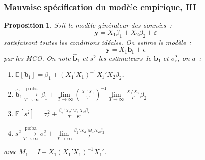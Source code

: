 \documentclass[10pt]{beamer}
\theoremstyle{plain}
\newtheorem{prop}{Proposition}
\begin{document}
\begin{frame}
  \frametitle{Mauvaise spécification du modèle empirique, III}

  \begin{prop}\label{prop:mispecification}
    Soit le modèle générateur des données~:
    \[
      \mathbf y = X_1\beta_1 + X_2\beta_2 + \varepsilon
    \]
    satisfaisant toutes les conditions idéales. On estime le modèle~:
    \[
      \mathbf y = X_1\mathbf b_1 + \epsilon
    \]
    par les MCO. On note $\hat{\mathbf b}_1$ et $s^2$ les estimateurs de $\mathbf b_1$ et $\sigma_{\varepsilon}^2$, on a~:
    \begin{enumerate}

    \item $\mathbb E\left[ \mathbf b_1 \right] = \beta_1 + (X_1'X_1)^{-1}X_1'X_2\beta_2$,
    \item $\hat{\mathbf b}_1 \overset{\text{proba}}{\underset{T\rightarrow\infty}{\longrightarrow}} \beta_1 + \underset{T\rightarrow\infty}{\lim}\left(\frac{X_1'X_1}{T}\right)^{-1}\underset{T\rightarrow\infty}{\lim}\frac{X_1'X_2}{T}\beta_2$
    \item $\mathbb E\left[s^2\right] = \sigma_{\varepsilon}^2  + \frac{\beta_2'X_2'M_1X_2\beta_2}{T-K}$
    \item $s^2 \overset{\text{proba}}{\underset{T\rightarrow\infty}{\longrightarrow}} \sigma_{\varepsilon}^2 + \underset{T\rightarrow\infty}{\lim}\frac{\beta_2'X_2'M_1X_2\beta_2}{T}$
    \end{enumerate}
    avec $M_1 = I-X_1(X_1'X_1)^{-1}X_1'$.
  \end{prop}

\end{frame}
\end{document}
